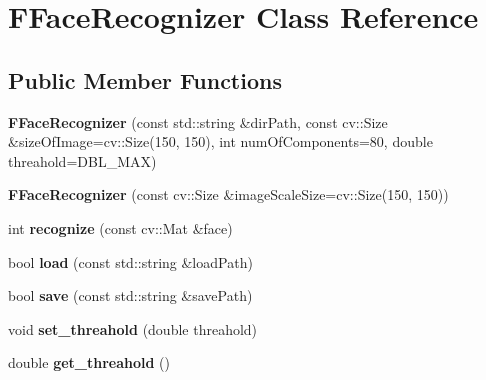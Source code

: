 \hypertarget{classFFaceRecognizer}{}\section{F\+Face\+Recognizer Class Reference}
\label{classFFaceRecognizer}
\subsection*{Public Member Functions}
\begin{DoxyCompactItemize}
\item 
\mbox{\label{classFFaceRecognizer_ae6cbd9976fcef82a1810c900461e4324}} 
{\bfseries F\+Face\+Recognizer} (const std\+::string \&dir\+Path, const cv\+::\+Size \&size\+Of\+Image=cv\+::\+Size(150, 150), int num\+Of\+Components=80, double threahold=D\+B\+L\+\_\+\+M\+AX)
\item 
\mbox{\label{classFFaceRecognizer_af53533828fa55959003de034ce36f5bc}} 
{\bfseries F\+Face\+Recognizer} (const cv\+::\+Size \&image\+Scale\+Size=cv\+::\+Size(150, 150))
\item 
\mbox{\label{classFFaceRecognizer_aa115a2ee94b62ba56c24677681d90cf5}} 
int {\bfseries recognize} (const cv\+::\+Mat \&face)
\item 
\mbox{\label{classFFaceRecognizer_aad62aeda81f1f80a1474a8c4b7cdffa6}} 
bool {\bfseries load} (const std\+::string \&load\+Path)
\item 
\mbox{\label{classFFaceRecognizer_a69dc6bf3209b3e8b46e0315682281ada}} 
bool {\bfseries save} (const std\+::string \&save\+Path)
\item 
\mbox{\label{classFFaceRecognizer_a281e25216015de853e1cf01689e13d9c}} 
void {\bfseries set\+\_\+threahold} (double threahold)
\item 
\mbox{\label{classFFaceRecognizer_a2e482df0822dc7747ef5cff0a31b75a8}} 
double {\bfseries get\+\_\+threahold} ()
\item 
\mbox{\label{classFFaceRecognizer_aeead25d21c46e87d6895fb63a80a084f}} 

\end{DoxyCompactItemize}
